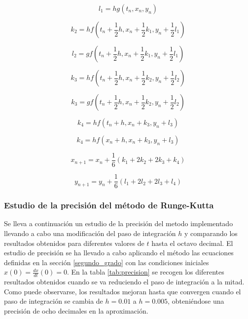 \documentclass[11pt]{article}
\begin{document}
\begin{equation}
	l_1 = hg(t_n, x_n, y_n)
\end{equation}

\begin{equation}
	k_2 = hf(t_n + \frac{1}{2}h, x_n + \frac{1}{2}k_1, y_n + \frac{1}{2}l_1)
\end{equation}

\begin{equation}
	l_2 = gf(t_n + \frac{1}{2}h, x_n + \frac{1}{2}k_1, y_n + \frac{1}{2}l_1)
\end{equation}

\begin{equation}
	k_3 = hf(t_n + \frac{1}{2}h, x_n + \frac{1}{2}k_2, y_n + \frac{1}{2}l_2)
\end{equation}

\begin{equation}
	k_3 = gf(t_n + \frac{1}{2}h, x_n + \frac{1}{2}k_2, y_n + \frac{1}{2}l_2)
\end{equation}

\begin{equation}
	k_4 = hf(t_n + h, x_n + k_3, y_n + l_3)
\end{equation}

\begin{equation}
	k_4 = hf(x_n + h, x_n + k_3, y_n + l_3)
\end{equation} 

\begin{equation}
	x_{n+1} = x_n + \frac{1}{6}(k_1 + 2k_2 + 2k_3 + k_4)
\end{equation}

\begin{equation}
	y_{n+1} = y_n + \frac{1}{6}(l_1 + 2l_2 + 2l_3 + l_4)
\end{equation}

\subsubsection{Estudio de la precisión del método de Runge-Kutta}
\label{precision-runge-kutta}
Se lleva a continuación un estudio de la precisión del metodo implementado llevando a cabo una modificación del paso de integración $h$ y comparando los resultados obtenidos para diferentes valores de $t$ hasta el octavo decimal. El estudio de precisión se ha llevado a cabo
aplicando el método las ecuaciones definidas en la sección \ref{segundo_grado} con las condiciones iniciales $x(0) = \frac{dx}{dt}(0) = 0$. 
En la tabla \ref{tab:precision} se recogen los diferentes resultados obtenidos cuando se va reduciendo el paso de integración a la mitad. Como puede observarse, los resultados mejoran hasta que convergen cuando el paso de integración se cambia de $h = 0.01$ a $h=0.005$, obteniéndose una precisión de ocho decimales en la aproximación. 
\end{document}
